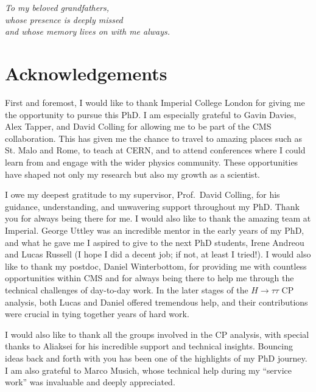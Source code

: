 \documentclass[12pt, a4paper, twoside]{report}
\begin{document}
\chapter*{}
\begin{center}
\vspace*{5cm}
\emph{To my beloved grandfathers,\\
whose presence is deeply missed\\
and whose memory lives on with me always.}
\end{center}

\chapter*{Acknowledgements}

First and foremost, I would like to thank Imperial College London for giving me the opportunity to pursue this PhD. I am especially grateful to Gavin Davies, Alex Tapper, and David Colling for allowing me to be part of the CMS collaboration. This has given me the chance to travel to amazing places such as St. Malo and Rome, to teach at CERN, and to attend conferences where I could learn from and engage with the wider physics community. These opportunities have shaped not only my research but also my growth as a scientist.  

I owe my deepest gratitude to my supervisor, Prof.~David Colling, for his guidance, understanding, and unwavering support throughout my PhD. Thank you for always being there for me. I would also like to thank the amazing team at Imperial. George Uttley was an incredible mentor in the early years of my PhD, and what he gave me I aspired to give to the next PhD students, Irene Andreou and Lucas Russell (I hope I did a decent job; if not, at least I tried!). I would also like to thank my postdoc, Daniel Winterbottom, for providing me with countless opportunities within CMS and for always being there to help me through the technical challenges of day-to-day work. In the later stages of the $H \to \tau\tau$ CP analysis, both Lucas and Daniel offered tremendous help, and their contributions were crucial in tying together years of hard work.  

I would also like to thank all the groups involved in the CP analysis, with special thanks to Aliaksei for his incredible support and technical insights. Bouncing ideas back and forth with you has been one of the highlights of my PhD journey. I am also grateful to Marco Musich, whose technical help during my ``service work'' was invaluable and deeply appreciated.  
\end{document}
